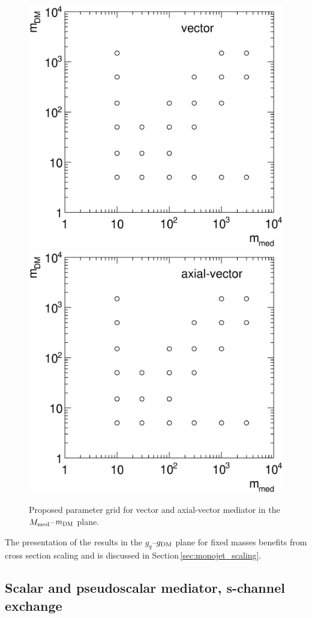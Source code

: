 \begin{figure}
\centering
\includegraphics[width=0.45\linewidth]{figures/monojet/grid_V.eps}
\includegraphics[width=0.45\linewidth]{figures/monojet/grid_A.eps}
\caption{Proposed parameter grid for vector and axial-vector mediator in the $M_{\rm{med}}$--$m_{\rm{DM}}$ plane.}
\label{fig:monojet_grid_V}
\end{figure}

The presentation of the results in the $g_q$--$g_{\rm{DM}}$ plane for fixed masses benefits from cross section scaling and is discussed in Section\,\ref{sec:monojet_scaling}.






\subsection{Scalar and pseudoscalar mediator, s-channel exchange}


